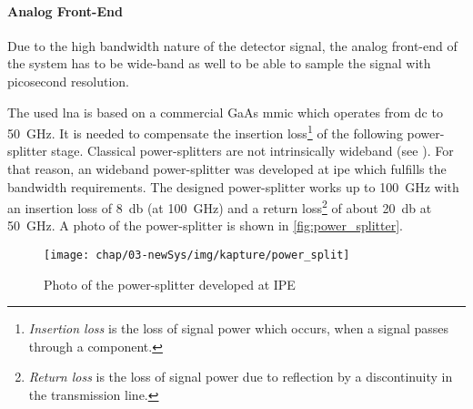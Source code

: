 \paragraph{Analog Front-End}
Due to the high bandwidth nature of the detector signal, the analog front-end of the system has to be wide-band as well to be able to sample the signal with picosecond resolution. 

The used \gls{lna} is based on a commercial GaAs \gls{mmic} which operates from \gls{dc} to \SI{50}{\giga \hertz}. 
It is needed to compensate the insertion loss\footnote{\textit{Insertion loss} is the loss of signal power which occurs, when a signal passes through a component.} of the following power-splitter stage. 
Classical power-splitters are not intrinsically wideband (see \cite{caselle2014}). 
For that reason, an wideband power-splitter was developed at \gls{ipe} which fulfills the bandwidth requirements. 
The designed power-splitter works up to \SI{100}{\giga \hertz} with an insertion loss of \SI{8}{\decibel} (at \SI{100}{\GHz}) and a return loss\footnote{\textit{Return loss} is the loss of signal power due to reflection by a discontinuity in the transmission line.} of about \SI{20}{\decibel} at \SI{50}{\giga \hertz}. \cite{caselle2014}
A photo of the power-splitter is shown in \autoref{fig:power_splitter}.

\begin{figure}[tb]
	\centering
	\texttt{[image: chap/03-newSys/img/kapture/power\_split]}
	\caption{Photo of the power-splitter developed at IPE}
	\label{fig:power_splitter}
\end{figure}

